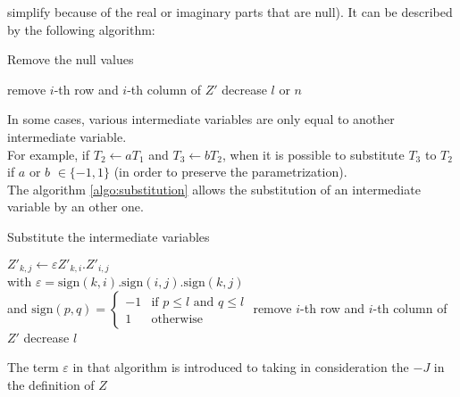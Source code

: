 \begin{command}{simplify}
because of the real or imaginary parts that are null). It can be
described by the following algorithm:\\
\begin{algorithm}[H]
\caption{\label{algo:null_values}Remove the null values}
\SetLine
{
remove $i$-th row and $i$-th column of $Z'$\;
decrease $l$ or $n$\;
}
\end{algorithm}
In some cases, various intermediate variables are only equal  to another intermediate variable.\\ For example,
if $T_2 \leftarrow aT_1$ and $T_3 \leftarrow bT_2$, when it is possible to substitute $T_3$ to $T_2$ if $a$ or
$b$ $\in\{-1,1\}$ (in order to preserve the parametrization).\\
The algorithm \ref{algo:substitution} allows the substitution of an intermediate variable by an other one.\\
\begin{algorithm}[H]
\caption{\label{algo:substitution}Substitute the intermediate variables}
\SetLine
{
{
{
$Z'_{k,j} \leftarrow \varepsilon Z'_{k,i}. Z'_{i,j}$\\
with $\varepsilon = \text{sign}(k,i).\text{sign}(i,j).\text{sign}(k,j)$\\
and $\text{sign}(p,q)=\begin{cases}-1 & \text{if\ } p \leq l \text{\ and\ } q \leq l \\ 1 & \text{otherwise}\end{cases}$
}
remove $i$-th row and $i$-th column of $Z'$\;
decrease $l$\;
}
}
\end{algorithm}
The term $\varepsilon$ in that algorithm is introduced to taking in consideration the $-J$ in the definition of $Z$

\end{command}
